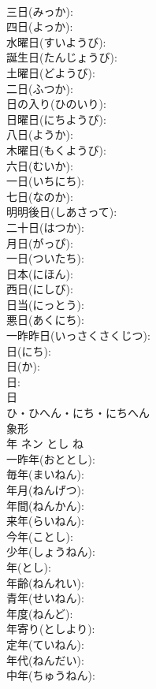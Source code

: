 \documentclass[8pt]{extreport}
\begin{document}
\begin{CJK}{UTF8}{min}
\\	三日(みっか): 
\\	四日(よっか): 
\\	水曜日(すいようび): 
\\	誕生日(たんじょうび): 
\\	土曜日(どようび): 
\\	二日(ふつか): 
\\	日の入り(ひのいり): 
\\	日曜日(にちようび): 
\\	八日(ようか): 
\\	木曜日(もくようび): 
\\	六日(むいか): 
\\	一日(いちにち): 
\\	七日(なのか): 
\\	明明後日(しあさって): 
\\	二十日(はつか): 
\\	月日(がっぴ): 
\\	一日(ついたち): 
\\	日本(にほん): 
\\	西日(にしび): 
\\	日当(にっとう): 
\\	悪日(あくにち): 
\\	一昨昨日(いっさくさくじつ): 
\\	日(にち): 
\\	日(か): 
\\	日: 
\\	日	
\\	ひ・ひへん・にち・にちへん	
\\	象形 
\\	年	ネン	とし	ね	
\\	一昨年(おととし): 
\\	毎年(まいねん): 
\\	年月(ねんげつ): 
\\	年間(ねんかん): 
\\	来年(らいねん): 
\\	今年(ことし): 
\\	少年(しょうねん): 
\\	年(とし): 
\\	年齢(ねんれい): 
\\	青年(せいねん): 
\\	年度(ねんど): 
\\	年寄り(としより): 
\\	定年(ていねん): 
\\	年代(ねんだい): 
\\	中年(ちゅうねん): 

\end{CJK}
\end{document}
